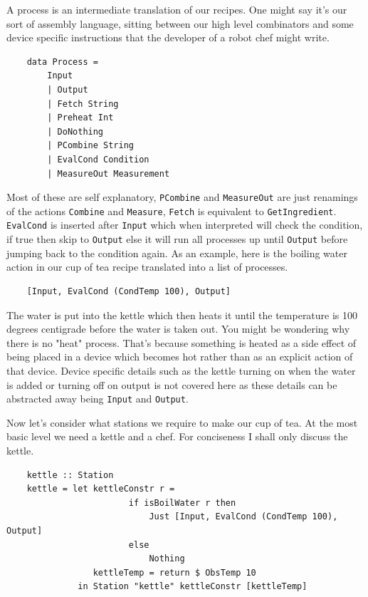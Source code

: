 \documentclass[11pt]{article}
\begin{document}
\medbreak

A process is an intermediate translation of our recipes. One might say it's our sort of assembly
language, sitting between our high level combinators and some device specific instructions that the
developer of a robot chef might write.

\begin{lstlisting}
    data Process =
        Input
        | Output
        | Fetch String
        | Preheat Int
        | DoNothing
        | PCombine String
        | EvalCond Condition
        | MeasureOut Measurement
\end{lstlisting}

Most of these are self explanatory, \texttt{PCombine} and \texttt{MeasureOut} are just renamings of
the actions \texttt{Combine} and \texttt{Measure}, \texttt{Fetch} is equivalent to \texttt{GetIngredient}.
\texttt{EvalCond} is inserted after \texttt{Input} which when interpreted will check the condition,
if true then skip to \texttt{Output} else it will run all processes up until \texttt{Output} before
jumping back to the condition again. As an example, here is the boiling water action in our cup of tea
recipe translated into a list of processes.

\begin{lstlisting}
    [Input, EvalCond (CondTemp 100), Output]
\end{lstlisting}

The water is put into the kettle which then heats it until the temperature is 100 degrees centigrade
before the water is taken out. You might be wondering why there is no "heat" process.
That's because something is heated as a side effect of being placed in a device which becomes hot
rather than as an explicit action of that device. Device specific details such as the kettle turning
on when the water is added or turning off on output is not covered here as these details can
be abstracted away being \texttt{Input} and \texttt{Output}.

\medbreak

Now let's consider what stations we require to make our cup of tea. At the most basic level
we need a kettle and a chef. For conciseness I shall only discuss the kettle.

\begin{lstlisting}
    kettle :: Station
    kettle = let kettleConstr r =
                        if isBoilWater r then
                            Just [Input, EvalCond (CondTemp 100), Output]
                        else
                            Nothing
                 kettleTemp = return $ ObsTemp 10
              in Station "kettle" kettleConstr [kettleTemp]
\end{lstlisting}
\end{document}
